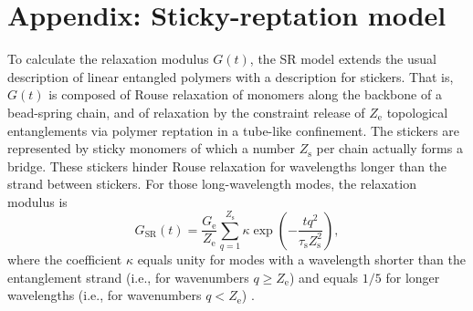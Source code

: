\documentclass[  superscriptaddress]{revtex4}
\begin{document}
\section{Appendix: Sticky-reptation model}\label{app:SRmodel}


To calculate the relaxation modulus $G(t)$, the SR model \cite{Leibler91} extends the usual description of linear entangled polymers \cite{McLeish02} with a description for stickers.
That is, $G(t)$ is composed of Rouse relaxation of monomers along the backbone of a bead-spring chain, and of relaxation by the constraint release of $Z_\mathrm{e}$ topological entanglements via polymer reptation in a tube-like confinement.
The stickers are represented by sticky monomers of which a number $Z_\mathrm{s}$ per chain actually forms a bridge. 
These stickers hinder Rouse relaxation for wavelengths longer than the strand between stickers.
For those long-wavelength modes, the relaxation modulus is
\begin{equation}
  G_\mathrm{SR}(t) =  \frac{G_\mathrm{e}}{Z_\mathrm{e}} \sum_{q=1}^{Z_\mathrm{s}}
\kappa \exp\left( -\frac{t q^2}{\tau_\mathrm{s}Z_\mathrm{s}^2} \right),
\end{equation}
where the coefficient $\kappa$ equals unity for modes with a wavelength shorter than the entanglement strand (i.e., for wavenumbers $q\geq Z_\mathrm{e}$) and equals $1/5$ for longer wavelengths (i.e., for wavenumbers $q<Z_\mathrm{e}$) \cite{Likhtman02}.
\end{document}
